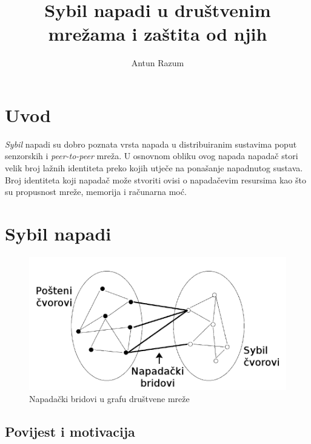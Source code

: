 \documentclass[times, utf8, seminar, numeric]{fer}
\begin{document}
\title{Sybil napadi u društvenim mrežama i zaštita od njih}
\author{Antun Razum}

\maketitle

\tableofcontents

\chapter{Uvod}
\textit{Sybil} napadi  su dobro poznata vrsta napada u distribuiranim sustavima poput senzorskih i \textit{peer-to-peer} mreža. U osnovnom obliku ovog napada napadač stori velik broj lažnih identiteta preko kojih utječe na ponašanje napadnutog sustava. Broj identiteta koji napadač može stvoriti ovisi o napadačevim resursima kao što su propusnost mreže, memorija i računarna moć.

\chapter{Sybil napadi}
\begin{figure}[h]
	\centering
	\includegraphics[scale=0.3]{attack.png}
	\caption{Napadački bridovi u grafu društvene mreže}
	\label{fig:attack}
\end{figure}

\section{Povijest i motivacija}
\end{document}
